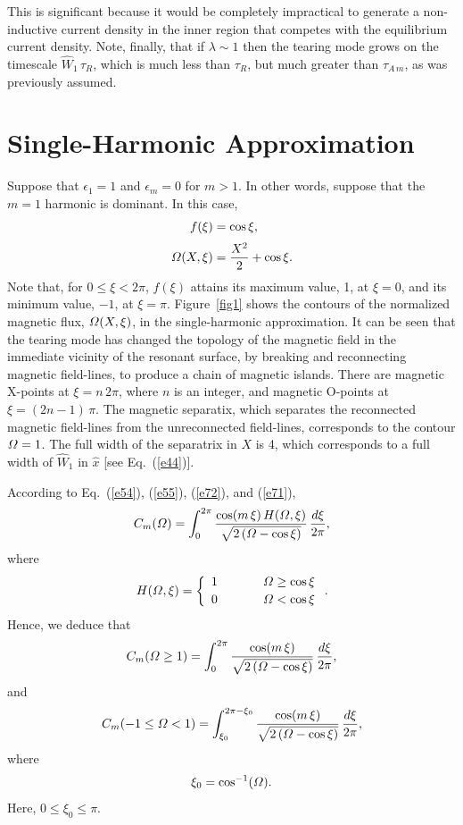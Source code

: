 \documentclass[12pt,prb,aps]{revtex4-1}
\begin{document}
This is significant because it would be completely impractical to generate a non-inductive current density
in the inner region that competes with the equilibrium current density.  Note, finally, that if $\lambda\sim 1$ then the tearing mode grows on the timescale $\hat{W}_1\,\tau_R$, which is much less than $\tau_R$, but much greater than
$\tau_{A\,m}$, as was previously assumed. 

\section{Single-Harmonic Approximation}\label{s1}
Suppose that $\epsilon_1=1$ and $\epsilon_m=0$ for $m>1$. In other words, suppose that the $m=1$ harmonic
is dominant. In this case,
\begin{align}
f(\xi) &= \cos\xi,\label{e71}\\[0.5ex]
{\mit\Omega}(X,\xi) &= \frac{X^2}{2}+\cos\xi.
\end{align}
Note that, for $0\leq \xi < 2\pi$, $f(\xi)$ attains its maximum value, 1, at $\xi=0$, and its minimum value, $-1$, at $\xi=\pi$. 
Figure~\ref{fig1} shows the contours of the normalized magnetic flux, ${\mit\Omega}(X,\xi)$, in the single-harmonic approximation. It can be seen that the tearing mode has changed the
topology of the magnetic field in the immediate vicinity of the resonant surface, by breaking and reconnecting magnetic field-lines,  to produce a chain of magnetic islands. There are magnetic
X-points at $\xi=n\,2\pi$, where $n$ is an integer, and magnetic O-points at $\xi=(2n-1)\,\pi$. The magnetic
separatix, which separates the reconnected magnetic field-lines from the unreconnected field-lines, corresponds to
the contour ${\mit\Omega}=1$. The full width of the separatrix in $X$ is 4, which corresponds to a full width
of $\hat{W}_1$ in $\hat{x}$ [see Eq.~(\ref{e44})]. 

According to Eq.~(\ref{e54}), (\ref{e55}), (\ref{e72}), and (\ref{e71}), 
\begin{equation}
 C_m({\mit\Omega})= \int_{0}^{2\pi}\frac{\cos(m\,\xi)\,H({\mit\Omega},\xi)}
 {\sqrt{2\left({\mit\Omega}-\cos\xi\right)}}\,\frac{d\xi}{2\pi},
 \end{equation}
 where
 \begin{equation}
 H({\mit\Omega},\xi) = \left\{
 \begin{array}{ccc} 1&~~~~~&{\mit\Omega}\geq \cos\xi\\[0.5ex]
 0 &&{\mit\Omega}< \cos\xi\end{array}\right..
 \end{equation}
 Hence, we deduce that
 \begin{equation}
 C_m({\mit\Omega}\geq 1)= \int_{0}^{2\pi}\frac{\cos(m\,\xi)}
 {\sqrt{2\left({\mit\Omega}-\cos\xi\right)}}\,\frac{d\xi}{2\pi},
\end{equation}
and 
 \begin{equation}
C_m(-1\leq {\mit\Omega}<1)= \int_{\xi_0}^{2\pi-\xi_0}\frac{\cos(m\,\xi)}
 {\sqrt{2\left({\mit\Omega}-\cos\xi\right)}}\,\frac{d\xi}{2\pi}, 
\end{equation}
 where
\begin{equation}
\xi_0=\cos^{-1}({\mit\Omega}).
\end{equation}
Here, $0\leq \xi_0\leq \pi$. 
\end{document}
